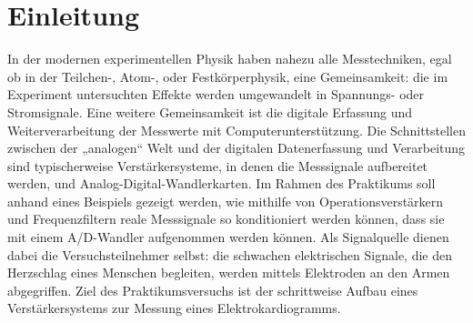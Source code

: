\chapter{Einleitung}
In der modernen experimentellen Physik haben nahezu alle Messtechniken, egal ob in der Teilchen-, Atom-, oder Festkörperphysik, eine Gemeinsamkeit: die im Experiment untersuchten Effekte werden umgewandelt in Spannungs- oder Stromsignale. Eine weitere Gemeinsamkeit ist die digitale Erfassung und Weiterverarbeitung der Messwerte mit Computerunterstützung. Die Schnittstellen zwischen der „analogen“ Welt und der digitalen Datenerfassung und Verarbeitung sind typischerweise Verstärkersysteme, in denen die Messsignale aufbereitet werden, und Analog-Digital-Wandlerkarten. Im Rahmen des Praktikums soll anhand eines Beispiels gezeigt werden, wie mithilfe von Operationsverstärkern und Frequenzfiltern reale Messsignale so konditioniert werden können, dass sie mit einem A/D-Wandler aufgenommen werden können. Als Signalquelle dienen dabei die Versuchsteilnehmer selbst: die schwachen elektrischen Signale, die den Herzschlag eines Menschen begleiten, werden mittels Elektroden an den Armen abgegriffen. Ziel des Praktikumsversuchs ist der schrittweise Aufbau eines Verstärkersystems zur Messung eines Elektrokardiogramms.

